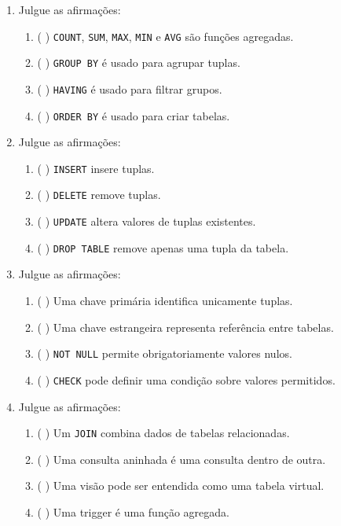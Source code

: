 \documentclass[12pt,a4paper]{article}
\begin{document}
\begin{enumerate}[resume,label=\textbf{Q\arabic*.}]
\item Julgue as afirmações:

\begin{enumerate}[label=\alph*)]
    \item ( \quad ) \texttt{COUNT}, \texttt{SUM}, \texttt{MAX}, \texttt{MIN} e \texttt{AVG} são funções agregadas.
    \item ( \quad ) \texttt{GROUP BY} é usado para agrupar tuplas.
    \item ( \quad ) \texttt{HAVING} é usado para filtrar grupos.
    \item ( \quad ) \texttt{ORDER BY} é usado para criar tabelas.
\end{enumerate}

\item Julgue as afirmações:

\begin{enumerate}[label=\alph*)]
    \item ( \quad ) \texttt{INSERT} insere tuplas.
    \item ( \quad ) \texttt{DELETE} remove tuplas.
    \item ( \quad ) \texttt{UPDATE} altera valores de tuplas existentes.
    \item ( \quad ) \texttt{DROP TABLE} remove apenas uma tupla da tabela.
\end{enumerate}

\item Julgue as afirmações:

\begin{enumerate}[label=\alph*)]
    \item ( \quad ) Uma chave primária identifica unicamente tuplas.
    \item ( \quad ) Uma chave estrangeira representa referência entre tabelas.
    \item ( \quad ) \texttt{NOT NULL} permite obrigatoriamente valores nulos.
    \item ( \quad ) \texttt{CHECK} pode definir uma condição sobre valores permitidos.
\end{enumerate}

\item Julgue as afirmações:

\begin{enumerate}[label=\alph*)]
    \item ( \quad ) Um \texttt{JOIN} combina dados de tabelas relacionadas.
    \item ( \quad ) Uma consulta aninhada é uma consulta dentro de outra.
    \item ( \quad ) Uma visão pode ser entendida como uma tabela virtual.
    \item ( \quad ) Uma trigger é uma função agregada.
\end{enumerate}

\end{enumerate}
\end{document}
